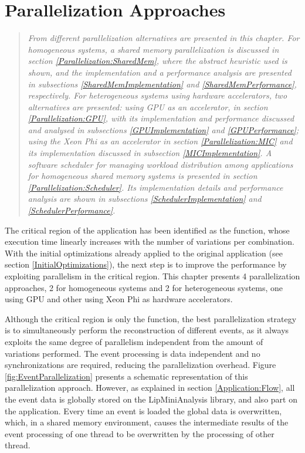 \chapter{Parallelization Approaches}
\label{ParallelizationApproaches}

\begin{quote}
\textit{From different parallelization alternatives are presented in this chapter. For homogeneous systems, a shared memory parallelization is discussed in section \ref{Parallelization:SharedMem}, where the abstract heuristic used is shown, and the implementation and a performance analysis are presented in subsections \ref{SharedMemImplementation} and \ref{SharedMemPerformance}, respectively. For heterogeneous systems using hardware accelerators, two alternatives are presented: using GPU as an accelerator, in section \ref{Parallelization:GPU}, with its implementation and performance discussed and analysed in subsections \ref{GPUImplementation} and \ref{GPUPerformance}; using the \intel Xeon Phi as an accelerator in section \ref{Parallelization:MIC} and its implementation discussed in subsection \ref{MICImplementation}. A software scheduler for managing workload distribution among applications for homogeneous shared memory systems is presented in section \ref{Parallelization:Scheduler}. Its implementation details and performance analysis are shown in subsections \ref{SchedulerImplementation} and \ref{SchedulerPerformance}.}
\end{quote}

The critical region of the \tth application has been identified as the \ttDilepKinFit function, whose execution time linearly increases with the number of variations per combination. With the initial optimizations already applied to the original application (see section \ref{InitialOptimizations}), the next step is to improve the performance by exploiting parallelism in the critical region. This chapter presents 4 parallelization approaches, 2 for homogeneous systems and 2 for heterogeneous systems, one using GPU and other using \intel Xeon Phi as hardware accelerators.

Although the critical region is only the \ttDilepKinFit function, the best parallelization strategy is to simultaneously perform the reconstruction of different events, as it always exploits the same degree of parallelism independent from the amount of variations performed. The event processing is data independent and no synchronizations are required, reducing the parallelization overhead. Figure \ref{fig:EventParallelization} presents a schematic representation of this parallelization approach. However, as explained in section \ref{Application:Flow}, all the event data is globally stored on the LipMiniAnalysis library, and also part on the application. Every time an event is loaded the global data is overwritten, which, in a shared memory environment, causes the intermediate results of the event processing of one thread to be overwritten by the processing of other thread.

